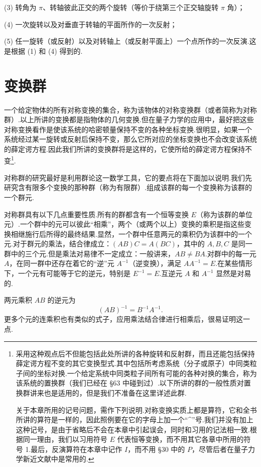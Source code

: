 (3) 转角为 $\pi$、转轴彼此正交的两个旋转（等价于绕第三个正交轴旋转 $\pi$ 角）；

(4) 一次旋转以及对垂直于转轴的平面所作的一次反射；

(5) 任一旋转（或反射）以及对转轴上（或反射平面上）一个点所作的一次反演.这是根据 (1) 和 (4) 得到的.

\section{变换群}

一个给定物体的所有对称变换的集合，称为该物体的对称变换群（或者简称为对称群）.以上所讲的变换都是指物体的几何变换.但在量子力学的应用中，最好把这些对称变换看作是使该系统的哈密顿量保持不变的各种坐标变换.很明显，如果一个系统经过某一旋转或反射后保持不变，那么它所对应的坐标变换也不会改变该系统的薛定谔方程.因此我们所讲的变换群将是这样的，它使所给的薛定谔方程保持不变\footnote{采用这种观点后不但能包括此处所讲的各种旋转和反射群，而且还能包括保持薛定谔方程不变的其它变换型式.其中包括所考虑系统（分子或原子）中同类粒子间的坐标对换.一个给定系统中同类粒子间所有可能的各种对换的集合，称为该系统的置换群（我们已经在 §63 中碰到过）.以下所讲的群的一般性质对置换群讲来也是适用的，但是我们不准备在这里详述此群.\par 关于本章所用的记号问题，需作下列说明.对称变换实质上都是算符，它和全书所讲的算符是一样的，因此照例要在它的字母上加一个“\textasciicircum{}”号.我们并没有加上这种记号，是由于省略后不会在本章中引起误会，同时和习用的记法相一致.根据同一理由，我们以习用符号 $E$ 代表恒等变换，而不用其它各章中所用的符号 1.最后，反演算符在本章中记作 $I$，而不用 §30 中的 $P$，尽管后者在量子力学新近文献中是常用的.}.

对称群的研究最好是利用群论这一数学工具，它的要点将在下面加以说明.我们先研究含有限多个变换的那种群（称为有限群）.组成该群的每一个变换称为该群的一个群元.

对称群具有以下几点重要性质.所有的群都含有一个恒等变换 $E$（称为该群的单位元）.一个群中的元可以彼此“相乘”，两个（或两个以上）变换的乘积是指这些变换相继施行后所得的最终结果.显然，一个群中任意两元的乘积仍为该群中的一个元.对于群元的乘法，结合律成立：$(AB)C=A(BC)$，其中的 $A,B,C$ 是同一群中的三个元.但是乘法对易律不一定成立：一般讲来，$AB\neq BA$.对群中的每一元 $A$，在同一群中还存在着它的“逆”元 $A^{-1}$（逆变换），满足 $AA^{-1}=E$.在某些情形下，一个元有可能等于它的逆元，特别是 $E^{-1}=E$.互逆元 $A$ 和 $A^{-1}$ 显然是对易的.

两元乘积 $AB$ 的逆元为
\begin{equation*}
  (AB)^{-1}=B^{-1}A^{-1}.
\end{equation*}
更多个元的连乘积也有类似的式子，应用乘法结合律进行相乘后，很易证明这一点.

